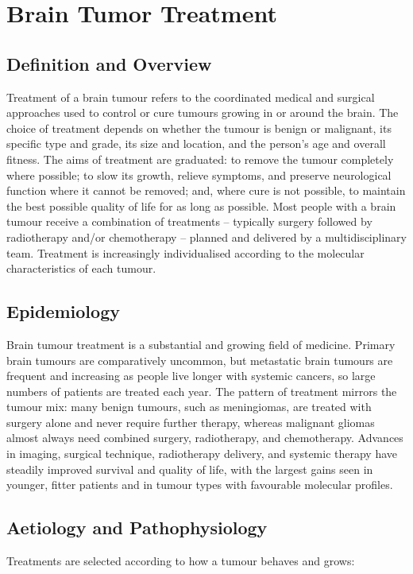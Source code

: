 \chapter{Brain Tumor Treatment}

\section*{Definition and Overview}
Treatment of a brain tumour refers to the coordinated medical and surgical approaches used to control or cure tumours growing in or around the brain. The choice of treatment depends on whether the tumour is benign or malignant, its specific type and grade, its size and location, and the person's age and overall fitness. The aims of treatment are graduated: to remove the tumour completely where possible; to slow its growth, relieve symptoms, and preserve neurological function where it cannot be removed; and, where cure is not possible, to maintain the best possible quality of life for as long as possible. Most people with a brain tumour receive a combination of treatments -- typically surgery followed by radiotherapy and/or chemotherapy -- planned and delivered by a multidisciplinary team. Treatment is increasingly individualised according to the molecular characteristics of each tumour.

\section*{Epidemiology}
Brain tumour treatment is a substantial and growing field of medicine. Primary brain tumours are comparatively uncommon, but metastatic brain tumours are frequent and increasing as people live longer with systemic cancers, so large numbers of patients are treated each year. The pattern of treatment mirrors the tumour mix: many benign tumours, such as meningiomas, are treated with surgery alone and never require further therapy, whereas malignant gliomas almost always need combined surgery, radiotherapy, and chemotherapy. Advances in imaging, surgical technique, radiotherapy delivery, and systemic therapy have steadily improved survival and quality of life, with the largest gains seen in younger, fitter patients and in tumour types with favourable molecular profiles.

\section*{Aetiology and Pathophysiology}
Treatments are selected according to how a tumour behaves and grows:

